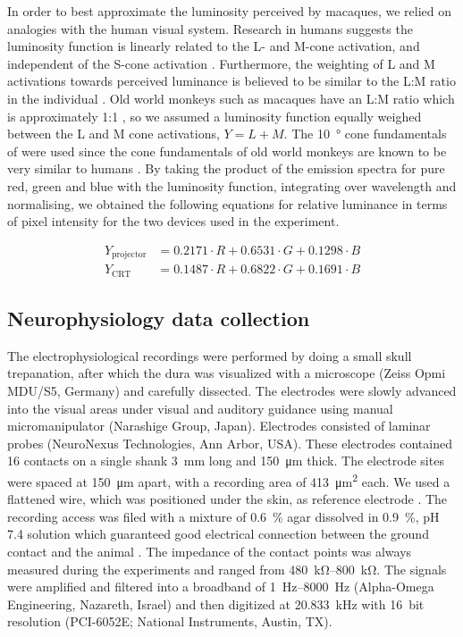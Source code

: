 In order to best approximate the luminosity perceived by macaques, we relied on analogies with the human visual system.
Research in humans suggests the luminosity function is linearly related to the L- and M-cone activation, and independent of the S-cone activation \citep{Stockman2008}.
Furthermore, the weighting of L and M activations towards perceived luminance is believed to be similar to the L:M ratio in the individual \citep{Stockman2008}.
Old world monkeys such as macaques have an L:M ratio which is approximately 1:1 \citep{Dobkins2000}, so we assumed a luminosity function equally weighed between the L and M cone activations, $Y=L+M$.
The \SI{10}{\degree} cone fundamentals of \citet{Stockman2000} were used since the cone fundamentals of old world monkeys are known to be very similar to humans \citep{Dobkins2000}.
By taking the product of the emission spectra for pure red, green and blue with the luminosity function, integrating over wavelength and normalising, we obtained the following equations for relative luminance in terms of pixel intensity for the two devices used in the experiment.

\begin{align}
    Y_{\text{projector}} &= 0.2171 \cdot R + 0.6531 \cdot G + 0.1298 \cdot B\\
    Y_{\text{CRT}}       &= 0.1487 \cdot R + 0.6822 \cdot G + 0.1691 \cdot B
\end{align}


\subsection{Neurophysiology data collection}

The electrophysiological recordings were performed by doing a small skull trepanation, after which the dura was visualized with a microscope (Zeiss Opmi MDU/S5, Germany) and carefully dissected.
The electrodes were slowly advanced into the visual areas under visual and auditory guidance using manual micromanipulator (Narashige Group, Japan).
Electrodes consisted of laminar probes (NeuroNexus Technologies, Ann Arbor, USA).
These electrodes contained \num{16} contacts on a single shank \SI{3}{\milli\metre} long and \SI{150}{\micro\metre} thick.
The electrode sites were spaced at \SI{150}{\micro\metre} apart, with a recording area of \SI{413}{\micro\metre^2} each.
We used a flattened  wire, which was positioned under the skin, as reference electrode \citep{Murayama2010}.
The recording access was filed with a mixture of \SI{0.6}{\percent} agar dissolved in  \SI{0.9}{\percent}, pH 7.4 solution which guaranteed good electrical connection between the ground contact and the animal \citep{Oeltermann2007760}.
The impedance of the contact points was always measured during the experiments and ranged from \SIrange{480}{800}{\kilo\ohm}.
The signals were amplified and filtered into a broadband of \SIrange{1}{8000}{Hz} (Alpha-Omega Engineering, Nazareth, Israel) and then digitized at \SI{20.833}{\kilo\Hz} with \SI{16}{bit} resolution (PCI-6052E; National Instruments, Austin, TX).


